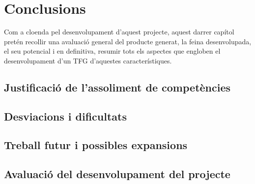 
\chapter{Conclusions} %

\label{Conclusions} %

Com a cloenda pel desenvolupament d'aquest projecte, aquest darrer capítol pretén recollir una avaluació general del producte generat, la feina desenvolupada, el seu potencial i en definitiva, resumir tots els aspectes que engloben el desenvolupament d'un TFG d'aquestes característiques.

\section{Justificació de l'assoliment de competències}



\section{Desviacions i dificultats}

\section{Treball futur i possibles expansions}

\section{Avaluació del desenvolupament del projecte}